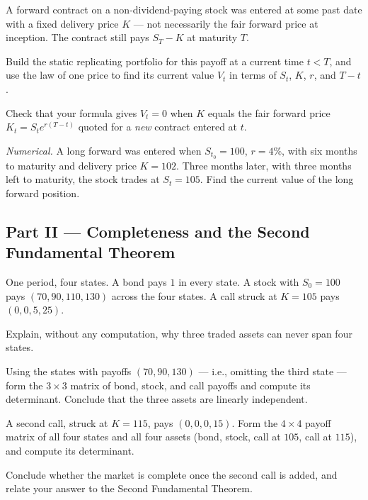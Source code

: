 \begin{exercise}
A forward contract on a non-dividend-paying stock was entered at some past
date with a fixed delivery price \(K\) --- not necessarily the fair forward
price at inception. The contract still pays \(S_T-K\) at maturity \(T\).
\begin{exparts}
  \item Build the static replicating portfolio for this payoff at a current
  time \(t<T\), and use the law of one price to find its current value
  \(V_t\) in terms of \(S_t\), \(K\), \(r\), and \(T-t\).
  \item Check that your formula gives \(V_t=0\) when \(K\) equals the fair
  forward price \(K_t=S_te^{r(T-t)}\) quoted for a \emph{new} contract entered
  at \(t\).
  \item \emph{Numerical.} A long forward was entered when \(S_{t_0}=100\),
  \(r=4\%\), with six months to maturity and delivery price \(K=102\).
  Three months later, with three months left to maturity, the stock trades
  at \(S_t=105\). Find the current value of the long forward position.
\end{exparts}
\end{exercise}


\subsection*{Part II --- Completeness and the Second Fundamental Theorem}

\begin{exercise}
One period, four states. A bond pays \(1\) in every state. A stock with
\(S_0=100\) pays \((70,90,110,130)\) across the four states. A call struck at
\(K=105\) pays \((0,0,5,25)\).
\begin{exparts}
  \item Explain, without any computation, why three traded assets can never
  span four states.
  \item Using the states with payoffs \((70,90,130)\) --- i.e., omitting the
  third state --- form the \(3\times3\) matrix of bond, stock, and call
  payoffs and compute its determinant. Conclude that the three assets are
  linearly independent.
  \item A second call, struck at \(K=115\), pays \((0,0,0,15)\). Form the
  \(4\times4\) payoff matrix of all four states and all four assets
  (bond, stock, call at \(105\), call at \(115\)), and compute its
  determinant.
  \item Conclude whether the market is complete once the second call is
  added, and relate your answer to the Second Fundamental Theorem.
\end{exparts}
\end{exercise}

